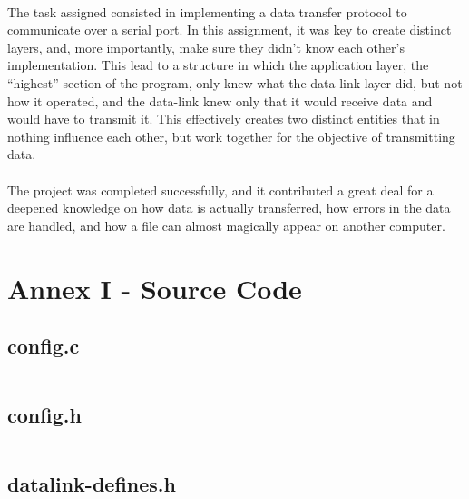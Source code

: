 \documentclass[11pt]{article}
\begin{document}
\paragraph{}The task assigned consisted in implementing a data transfer protocol to communicate over a serial
port. In this assignment, it was key to create distinct layers, and, more importantly, make sure they didn't
know each other's implementation. This lead to a structure in which the application layer, the ``highest''
section of the program, only knew what the data-link layer did, but not how it operated, and the data-link
knew only that it would receive data and would have to transmit it. This effectively creates two distinct
entities that in nothing influence each other, but work together for the objective of transmitting data.

\paragraph{}The project was completed successfully, and it contributed a great deal for a deepened knowledge
on how data is actually transferred, how errors in the data are handled, and how a file can almost magically
appear on another computer.

\newpage

\section*{Annex I - Source Code}

\subsection*{config.c}

\inputminted{c}{config.c}

\newpage

\subsection*{config.h}

\inputminted{c}{config.h}

\newpage

\subsection*{datalink-defines.h}

\inputminted{c}{datalink-defines.h}

\newpage
\end{document}
